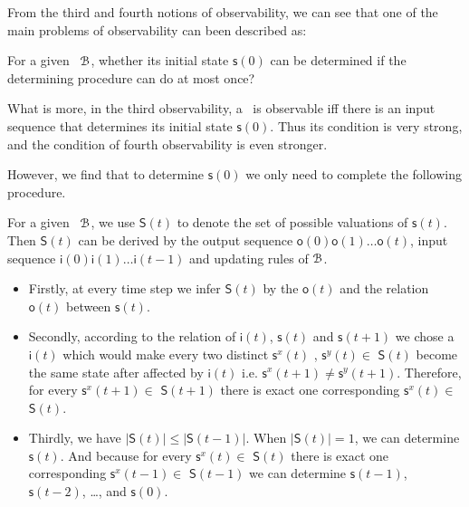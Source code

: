  From the third and fourth notions of observability, we can see that one of the main problems of observability can been described as: 

\begin{problem}
\label{pro:1}
For a given \BCN\ ${\mathcal{B}}$, whether its initial state $\mathsf{s}(0)$ can be determined if the determining procedure can do at most once?
\end{problem}

 What is more, in the third observability, a \BCN\ is observable iff there is an input sequence that determines its initial state $\mathsf{s}(0)$. Thus its condition is very strong, and the condition of fourth observability is even stronger.

However, we find that to determine $\mathsf{s}(0)$ we only need to complete the following procedure.

For a given \BCN\  ${\mathcal{B}}$, we use $\mathsf{S}(t)$ to denote the set of possible valuations of $\mathsf{s}(t)$. Then $\mathsf{S}(t)$ can be derived by the output sequence $\mathsf{o}(0)\mathsf{o}(1)\ldots\mathsf{o}(t)$, input sequence $\mathsf{i}(0)\mathsf{i}(1)\ldots\mathsf{i}(t-1)$ and updating rules of ${\mathcal{B}}$.
\begin{itemize}
	\item  Firstly, at every time step we infer $\mathsf{S}(t)$ by the $\mathsf{o}(t)$ and the relation $\mathsf{o}(t)$ between $\mathsf{s}(t)$.
	\item Secondly, according to the relation of $\mathsf{i}(t)$, $\mathsf{s}(t)$ and $\mathsf{s}(t+1)$ we chose a $\mathsf{i}(t)$ which would make every two distinct $\mathsf{s}^{x}(t)$ , $\mathsf{s}^{y}(t)$$\in$ $\mathsf{S}(t)$ become the same state after affected by $\mathsf{i}(t)$ i.e. $\mathsf{s}^{x}(t+1)\ne\mathsf{s}^{y}(t+1)$. Therefore, for every $\mathsf{s}^{x}(t+1)\in $ $\mathsf{S}(t+1)$ there is exact one corresponding $\mathsf{s}^{x}(t)\in $ $\mathsf{S}(t)$.
	\item Thirdly, we have $|$$\mathsf{S}(t)$$|\le|$$\mathsf{S}(t-1)$$|$. When $|$$\mathsf{S}(t)$$|=1$, we can determine $\mathsf{s}(t)$. And because for every $\mathsf{s}^{x}(t)\in $ $\mathsf{S}(t)$ there is exact one corresponding $\mathsf{s}^{x}(t-1)\in $ $\mathsf{S}(t-1)$ we can determine $\mathsf{s}(t-1)$, $\mathsf{s}(t-2)$, \ldots, and $\mathsf{s}(0)$.
\end{itemize}

